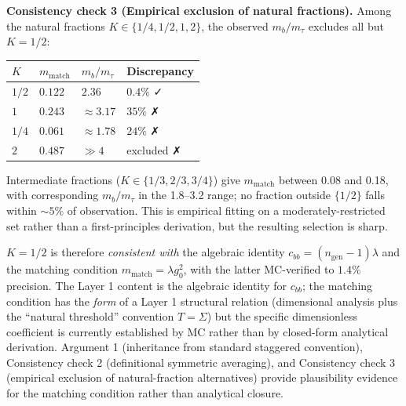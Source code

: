 \documentclass[
]{article}
\begin{document}
\textbf{Consistency check 3 (Empirical exclusion of natural fractions).}
Among the natural fractions \(K \in \{1/4, 1/2, 1, 2\}\), the observed
\(m_b/m_\tau\) excludes all but \(K = 1/2\):

\begin{longtable}[]{@{}llll@{}}
\toprule\noalign{}
\(K\) & \(m_{\text{match}}\) & \(m_b/m_\tau\) & Discrepancy \\
\midrule\noalign{}
\endhead
\bottomrule\noalign{}
\endlastfoot
\(1/2\) & \(0.122\) & \(2.36\) & \(0.4\%\) ✓ \\
\(1\) & \(0.243\) & \(\approx 3.17\) & \(35\%\) ✗ \\
\(1/4\) & \(0.061\) & \(\approx 1.78\) & \(24\%\) ✗ \\
\(2\) & \(0.487\) & \(\gg 4\) & excluded ✗ \\
\end{longtable}

Intermediate fractions (\(K \in \{1/3, 2/3, 3/4\}\)) give
\(m_{\text{match}}\) between 0.08 and 0.18, with corresponding
\(m_b/m_\tau\) in the 1.8--3.2 range; no fraction outside \(\{1/2\}\)
falls within \(\sim 5\%\) of observation. This is empirical fitting on a
moderately-restricted set rather than a first-principles derivation, but
the resulting selection is sharp.

\(K = 1/2\) is therefore \emph{consistent with} the algebraic identity
\(c_{bb} = (n_{\text{gen}}-1)\lambda\) and the matching condition
\(m_{\text{match}} = \lambda g_0^2\), with the latter MC-verified to
\(1.4\%\) precision. The Layer 1 content is the algebraic identity for
\(c_{bb}\); the matching condition has the \emph{form} of a Layer 1
structural relation (dimensional analysis plus the ``natural threshold''
convention \(T = \Sigma\)) but the specific dimensionless coefficient is
currently established by MC rather than by closed-form analytical
derivation. Argument 1 (inheritance from standard staggered convention),
Consistency check 2 (definitional symmetric averaging), and Consistency
check 3 (empirical exclusion of natural-fraction alternatives) provide
plausibility evidence for the matching condition rather than analytical
closure.
\end{document}
